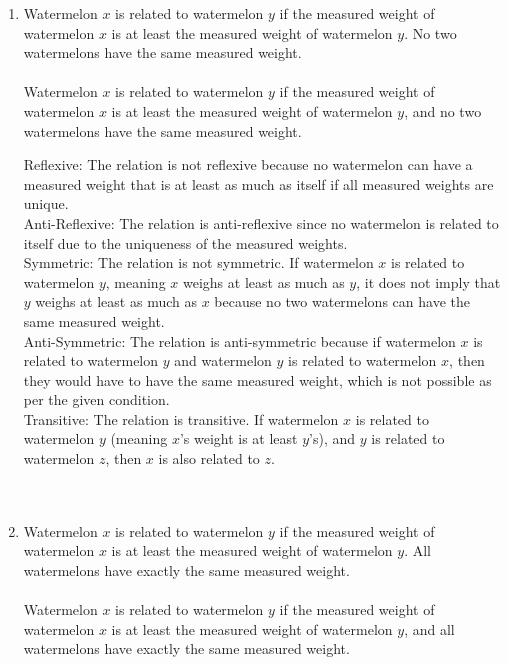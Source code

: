 \documentclass{amsart}
\theoremstyle{definition}
\theoremstyle{Exercise}
\theoremstyle{remark}
\theoremstyle{rule}
\numberwithin{equation}{section}
\begin{document}
\begin{enumerate}[label=(\alph*)]
\item Watermelon $x$ is related to watermelon $y$ if the measured weight of watermelon $x$ is at least the measured weight of watermelon $y$. No two watermelons have the same measured weight.\\\\
Watermelon \( x \) is related to watermelon \( y \) if the measured weight of watermelon \( x \) is at least the measured weight of watermelon \( y \), and no two watermelons have the same measured weight.

Reflexive: The relation is not reflexive because no watermelon can have a measured weight that is at least as much as itself if all measured weights are unique.\\
Anti-Reflexive: The relation is anti-reflexive since no watermelon is related to itself due to the uniqueness of the measured weights.\\
Symmetric: The relation is not symmetric. If watermelon \( x \) is related to watermelon \( y \), meaning \( x \) weighs at least as much as \( y \), it does not imply that \( y \) weighs at least as much as \( x \) because no two watermelons can have the same measured weight.\\
Anti-Symmetric: The relation is anti-symmetric because if watermelon \( x \) is related to watermelon \( y \) and watermelon \( y \) is related to watermelon \( x \), then they would have to have the same measured weight, which is not possible as per the given condition.\\
Transitive: The relation is transitive. If watermelon \( x \) is related to watermelon \( y \) (meaning \( x \)'s weight is at least \( y \)'s), and \( y \) is related to watermelon \( z \), then \( x \) is also related to \( z \).\\
\\\\
\item Watermelon $x$ is related to watermelon $y$ if the measured weight of watermelon $x$ is at least the measured weight of watermelon $y$. All watermelons have exactly the same measured weight.\\\\
Watermelon \( x \) is related to watermelon \( y \) if the measured weight of watermelon \( x \) is at least the measured weight of watermelon \( y \), and all watermelons have exactly the same measured weight.


\end{enumerate}
\end{document}
